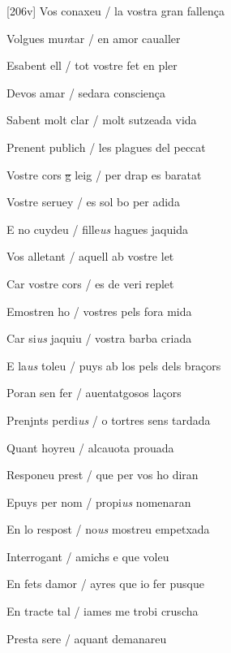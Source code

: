\documentclass[12pt]{article}
\begin{document}
\begin{estrofa}

 [206v] Vos conaxeu / la vostra gran fallen\c{c}a

 Volgues mu\textit{n}tar / en amor caualler

 Esabent ell / tot vostre fet en pler

 Devos amar / sedara conscien\c{c}a

 Sabent molt clar / molt sutzeada vida

 Prenent publich / les plagues del peccat

 Vostre cors \sout{g} leig / per drap es baratat

 Vostre seruey / es sol bo per adida

\end{estrofa}



\begin{estrofa}

 E no cuydeu / fille\textit{us} hagues jaquida

 Vos alletant / aquell ab vostre let

 Car vostre cors / es de veri replet

 Emostren ho / vostres pels fora mida

 Car si\textit{us} jaquiu / vostra barba criada

 E la\textit{us} toleu / puys ab los pels dels bra\c{c}ors

 Poran sen fer / auentatgosos la\c{c}ors

 Prenjnts perdi\textit{us} / o tortres sens tardada

\end{estrofa}



\begin{estrofa}

 Quant hoyreu / alcauota prouada

 Responeu prest / que per vos ho diran

 Epuys per nom / propi\textit{us} nomenaran

 En lo respost / no\textit{us} mostreu empetxada

 Interrogant / amichs e que voleu

 En fets damor / ayres que io fer pusque

 En tracte tal / iames me trobi cruscha

 Presta sere / aquant demanareu

\end{estrofa}
\end{document}
